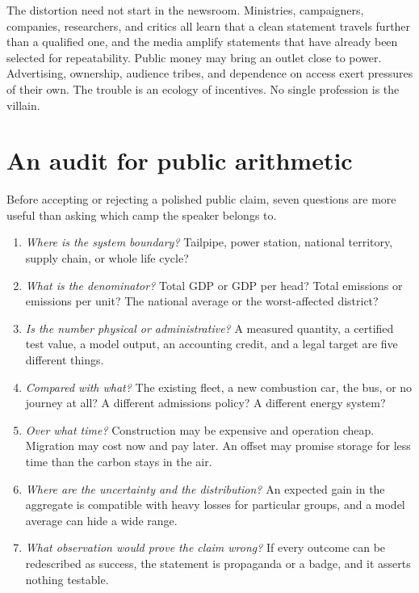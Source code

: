 \documentclass[12pt,a4paper]{book}
\begin{document}
The distortion need not start in the newsroom. Ministries, campaigners, companies, researchers, and critics all learn that a clean statement travels further than a qualified one, and the media amplify statements that have already been selected for repeatability. Public money may bring an outlet close to power. Advertising, ownership, audience tribes, and dependence on access exert pressures of their own. The trouble is an ecology of incentives. No single profession is the villain.

\section{An audit for public arithmetic}

Before accepting or rejecting a polished public claim, seven questions are more useful than asking which camp the speaker belongs to.

\begin{enumerate}
\item \emph{Where is the system boundary?} Tailpipe, power station, national territory, supply chain, or whole life cycle?

\item \emph{What is the denominator?} Total GDP or GDP per head? Total emissions or emissions per unit? The national average or the worst-affected district?

\item \emph{Is the number physical or administrative?} A measured quantity, a certified test value, a model output, an accounting credit, and a legal target are five different things.

\item \emph{Compared with what?} The existing fleet, a new combustion car, the bus, or no journey at all? A different admissions policy? A different energy system?

\item \emph{Over what time?} Construction may be expensive and operation cheap. Migration may cost now and pay later. An offset may promise storage for less time than the carbon stays in the air.

\item \emph{Where are the uncertainty and the distribution?} An expected gain in the aggregate is compatible with heavy losses for particular groups, and a model average can hide a wide range.

\item \emph{What observation would prove the claim wrong?} If every outcome can be redescribed as success, the statement is propaganda or a badge, and it asserts nothing testable.
\end{enumerate}
\end{document}

